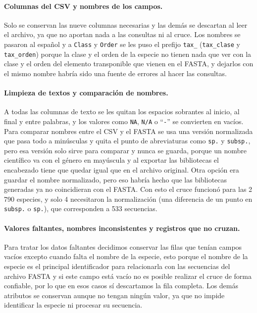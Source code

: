 \paragraph{Columnas del CSV y nombres de los campos.}
Solo se conservan las nueve columnas necesarias y las demás se descartan al
leer el archivo, ya que no aportan nada a las consultas ni al cruce. Los
nombres se pasaron al español y a \texttt{Class} y \texttt{Order} se les
puso el prefijo \texttt{tax\_} (\texttt{tax\_clase} y \texttt{tax\_orden})
porque la clase y el orden de la especie no tienen nada que ver con la clase
y el orden del elemento transponible que vienen en el FASTA, y dejarlos con
el mismo nombre habría sido una fuente de errores al hacer las consultas.

\paragraph{Limpieza de textos y comparación de nombres.}
A todas las columnas de texto se les quitan los espacios sobrantes al
inicio, al final y entre palabras, y los valores como \texttt{NA},
\texttt{N/A} o ``\texttt{-}'' se convierten en vacíos. Para comparar nombres
entre el CSV y el FASTA se usa una versión normalizada que pasa todo a
minúsculas y quita el punto de abreviaturas como \texttt{sp.} y
\texttt{subsp.}, pero esa versión solo sirve para comparar y nunca se
guarda, porque un nombre científico va con el género en mayúscula y al
exportar las bibliotecas el encabezado tiene que quedar igual que en el
archivo original. Otra opción era guardar el nombre normalizado, pero eso
habría hecho que las bibliotecas generadas ya no coincidieran con el FASTA.
Con esto el cruce funcionó para las 2\,790 especies, y solo 4 necesitaron la
normalización (una diferencia de un punto en \texttt{subsp.} o
\texttt{sp.}), que corresponden a 533 secuencias.

\paragraph{Valores faltantes, nombres inconsistentes y registros que no
cruzan.}
Para tratar los datos faltantes decidimos conservar las filas que tenían
campos vacíos excepto cuando falta el nombre de la especie, esto porque el
nombre de la especie es el principal identificador para relacionarla con las
secuencias del archivo FASTA y si este campo está vacío no es posible
realizar el cruce de forma confiable, por lo que en esos casos sí
descartamos la fila completa. Los demás atributos se conservan aunque no
tengan ningún valor, ya que no impide identificar la especie ni procesar su
secuencia.

